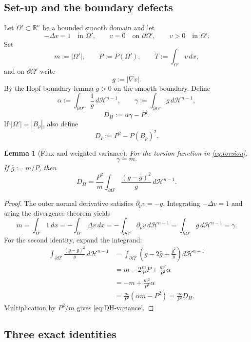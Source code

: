\documentclass[11pt]{amsart}
\newtheorem{lemma}[theorem]{Lemma}
\theoremstyle{definition}
\newcommand{\R}{\mathbb R}
\newcommand{\Hn}{\mathcal H^{n-1}}
\newcommand{\Om}{\Omega}
\newcommand{\Per}{P}
\begin{document}
\subsection{Set-up and the boundary defects}

Let \(\Om'\subset\R^n\) be a bounded smooth domain and let
\[
   -\Delta v=1\quad\text{in }\Om',\qquad
   v=0\quad\text{on }\partial\Om',\qquad
   v>0\quad\text{in }\Om'.
\tag{5.1}\label{eq:torsion}
\]
Set
\[
   m:=|\Om'|,\qquad P:=\Per(\Om'),\qquad
   T:=\int_{\Om'}v\,dx,
\]
and on \(\partial\Om'\) write
\[
   g:=|\nabla v|.
\]
By the Hopf boundary lemma \(g>0\) on the smooth boundary.  Define
\[
   \alpha:=\int_{\partial\Om'}\frac1g\,d\Hn,\qquad
   \gamma:=\int_{\partial\Om'}g\,d\Hn,
\]
\[
   D_H:=\alpha\gamma-P^2.
\tag{5.2}\label{eq:DH}
\]
If \(|\Om'|=|B_\rho|\), also define
\[
   D_I:=P^2-\Per(B_\rho)^2.
\tag{5.3}\label{eq:DI}
\]

\begin{lemma}[Flux and weighted variance]\label{lem:flux-variance}
For the torsion function in \eqref{eq:torsion},
\[
   \gamma=m.
\tag{5.4}\label{eq:flux}
\]
If \(\bar g:=m/P\), then
\[
   D_H=\frac{P^2}{m}
      \int_{\partial\Om'}\frac{(g-\bar g)^2}{g}\,d\Hn.
\tag{5.5}\label{eq:DH-variance}
\]
\end{lemma}

\begin{proof}
The outer normal derivative satisfies \(\partial_\nu v=-g\).  Integrating
\(-\Delta v=1\) and using the divergence theorem yields
\[
   m=\int_{\Om'}1\,dx
   =-\int_{\Om'}\Delta v\,dx
   =-\int_{\partial\Om'}\partial_\nu v\,d\Hn
   =\int_{\partial\Om'}g\,d\Hn=\gamma.
\]
For the second identity, expand the integrand:
\[
\begin{aligned}
   \int_{\partial\Om'}\frac{(g-\bar g)^2}{g}\,d\Hn
   &=\int_{\partial\Om'}
       \left(g-2\bar g+\frac{\bar g^2}{g}\right)d\Hn \\
   &=m-2\frac mP P+\frac{m^2}{P^2}\alpha \\
   &=-m+\frac{m^2}{P^2}\alpha \\
   &=\frac m{P^2}(\alpha m-P^2)
    =\frac m{P^2}D_H.
\end{aligned}
\]
Multiplication by \(P^2/m\) gives \eqref{eq:DH-variance}.
\end{proof}

\subsection{Three exact identities}
\end{document}
